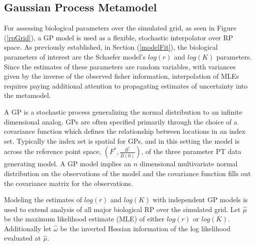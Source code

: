 \documentclass[12pt]{article}
\begin{document}
{%
\subsection{Gaussian Process Metamodel}
%

%
For assessing biological parameters over the simulated grid, as seen in 
Figure (\ref{rpGrid}), a GP model is used as a flexible, stochastic interpolator 
over RP space. As previously established, in Section (\ref{modelFit}), the 
biological parameters of interest are the Schaefer model's $log(r)$ and $log(K)$ 
parameters. Since the estimates of these parameters are random variables, with 
variances given by the inverse of the observed fisher information, 
interpolation of MLEs requires paying additional attention to propagating 
estimates of uncertainty into the metamodel. 


%
A GP is a stochastic process generalizing the normal distribution to an
infinite dimensional analog. GPs are often specified primarily through the
choice of a covariance function which defines the relationship between
locations in an index set. Typically the index set is spatial for GPs, and in
this setting the model is across the reference point space, 
$\left(F^*, \frac{B^*}{\bar B(0)}\right)$, of the three parameter
PT data generating model. A GP model implies an $n$ dimensional multivariate 
normal distribution on the observations of the model and the covariance function 
fills out the covariance matrix for the observations.

Modeling the estimates of $log(r)$ and $log(K)$ with independent GP models is 
used to extend analysis of all major biological RP over the simulated grid. 
Let $\hat\mu$ be the maximum likelihood estimate (MLE) of either $log(r)$ or 
$log(K)$. Additionally let $\hat\omega$ be the inverted Hessian information of 
the log likelihood evaluated at $\hat\mu$. 

}
\end{document}
